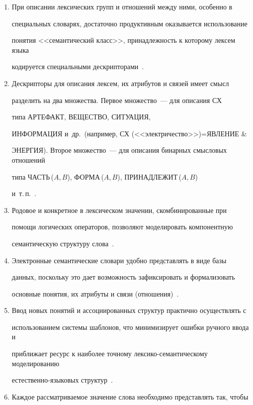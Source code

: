    \begin{enumerate}[1.]


\item При описании лексических групп и отношений между ними, особенно в 


специальных словарях, достаточно продуктивным оказывается использование 


понятия <<семантический класс>>, принадлежность к которому лексем языка 


кодируется специальными дескрипторами~\cite{1-2-11}.


\item Дескрипторы для описания лексем, их атрибутов и связей имеет смысл 


разделить на два множества. Первое множество~--- для описания СХ 


типа АРТЕФАКТ, ВЕЩЕСТВО, СИТУАЦИЯ, 


ИНФОРМАЦИЯ и~др.\ (например, СХ (<<электричество>>)\;=\;ЯВЛЕНИЕ \& 


ЭНЕРГИЯ). Второе множество~--- для описания бинарных смысловых отношений 


типа ЧАСТЬ\,($A,B$), ФОРМА\,($A,B$), ПРИНАДЛЕЖИТ\,($A,B$) 


и~т.\,п.~\cite{1-2-11}.


\item Родовое и конкретное в лексическом значении, скомбинированные при 


помощи логических операторов, позволяют моделировать компонентную 


семантическую структуру слова~\cite{1-2-11, 2-2-11}.


\item Электронные семантические словари удобно представлять в виде базы 


данных, поскольку это дает возможность зафиксировать и формализовать 


основные понятия, их атрибуты и связи (отношения)~\cite{1-2-11, 7-2-11}.


\item Ввод новых понятий и ассоциированных структур практично осуществлять с 


использованием системы шаблонов, что минимизирует ошибки ручного ввода и 


приближает ресурс к наиболее точному лексико-семантическому моделированию 


естественно-языковых структур~\cite{2-2-11}.


\item Каждое рассматриваемое значение слова необходимо представлять так, чтобы 



\end{enumerate}
